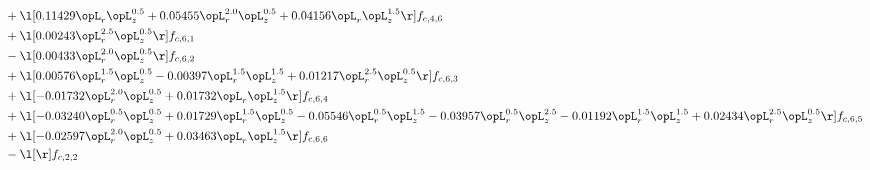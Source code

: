 \begin{alignat}{2}
& + \l[  0.11429 \opL_r \opL_z^{0.5} +  0.05455 \opL_r^{2.0} \opL_z^{0.5} +  0.04156 \opL_r \opL_z^{1.5}  \r] f_{c,4,6} \nonumber \\ 
& + \l[  0.00243 \opL_r^{2.5} \opL_z^{0.5}  \r] f_{c,6,1} \nonumber \\ 
& - \l[  0.00433 \opL_r^{2.0} \opL_z^{0.5}  \r] f_{c,6,2} \nonumber \\ 
& + \l[  0.00576 \opL_r^{1.5} \opL_z^{0.5}   -0.00397 \opL_r^{1.5} \opL_z^{1.5} +  0.01217 \opL_r^{2.5} \opL_z^{0.5}  \r] f_{c,6,3} \nonumber \\ 
& + \l[  -0.01732 \opL_r^{2.0} \opL_z^{0.5} +  0.01732 \opL_r \opL_z^{1.5}  \r] f_{c,6,4} \nonumber \\ 
& + \l[  -0.03240 \opL_r^{0.5} \opL_z^{0.5} +  0.01729 \opL_r^{1.5} \opL_z^{0.5}   -0.05546 \opL_r^{0.5} \opL_z^{1.5}   -0.03957 \opL_r^{0.5} \opL_z^{2.5}   -0.01192 \opL_r^{1.5} \opL_z^{1.5} +  0.02434 \opL_r^{2.5} \opL_z^{0.5}  \r] f_{c,6,5} \nonumber \\ 
& + \l[  -0.02597 \opL_r^{2.0} \opL_z^{0.5} +  0.03463 \opL_r \opL_z^{1.5}  \r] f_{c,6,6} \nonumber \\ 
& - \l[  \r] f_{c,2,2} \nonumber \\ 
\end{alignat} 



